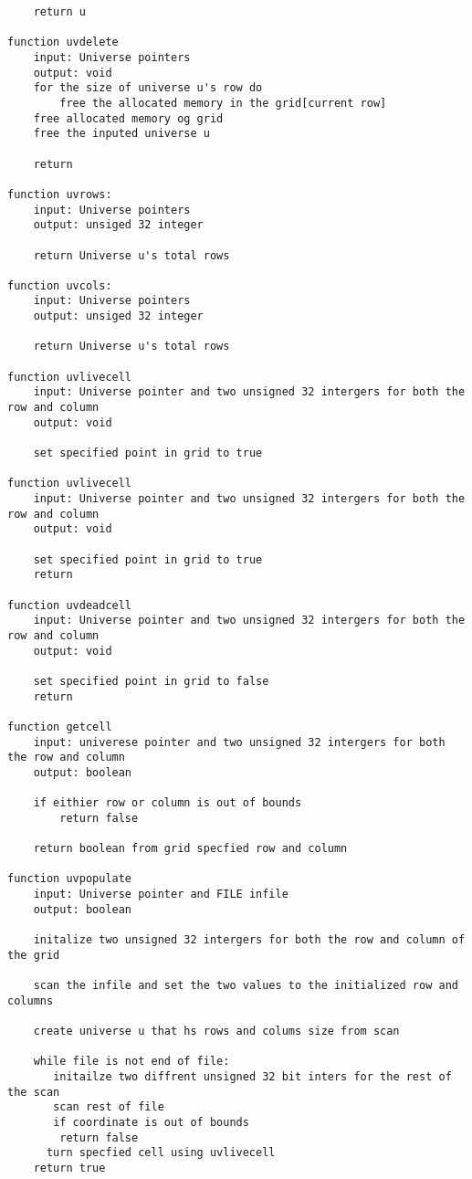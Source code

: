\documentclass[11pt]{article} %
\begin{document}
\begin{flushleft}
\begin{lstlisting}
    return u

function uvdelete
    input: Universe pointers
    output: void
    for the size of universe u's row do
        free the allocated memory in the grid[current row]
    free allocated memory og grid
    free the inputed universe u
    
    return

function uvrows:
    input: Universe pointers
    output: unsiged 32 integer

    return Universe u's total rows

function uvcols:
    input: Universe pointers
    output: unsiged 32 integer

    return Universe u's total rows

function uvlivecell
    input: Universe pointer and two unsigned 32 intergers for both the row and column
    output: void

    set specified point in grid to true

function uvlivecell
    input: Universe pointer and two unsigned 32 intergers for both the row and column
    output: void

    set specified point in grid to true
    return

function uvdeadcell
    input: Universe pointer and two unsigned 32 intergers for both the row and column
    output: void

    set specified point in grid to false
    return

function getcell
    input: univerese pointer and two unsigned 32 intergers for both the row and column
    output: boolean
    
    if eithier row or column is out of bounds
        return false
    
    return boolean from grid specfied row and column 

function uvpopulate
    input: Universe pointer and FILE infile
    output: boolean

    initalize two unsigned 32 intergers for both the row and column of the grid

    scan the infile and set the two values to the initialized row and columns

    create universe u that hs rows and colums size from scan

    while file is not end of file:
       initailze two diffrent unsigned 32 bit inters for the rest of the scan
       scan rest of file
       if coordinate is out of bounds
        return false
      turn specfied cell using uvlivecell
    return true


\end{lstlisting}
\end{flushleft}
\end{document}
